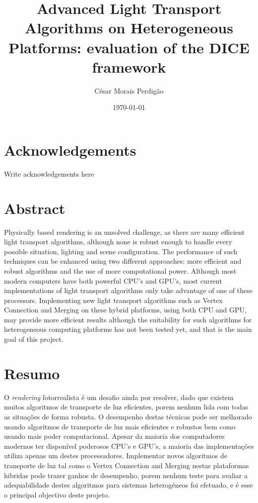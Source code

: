 \documentclass[
  oneside,
  11pt, a4paper,
  footinclude=true,
  headinclude=true,
  cleardoublepage=empty
]{scrbook}
\title{Advanced Light Transport Algorithms on Heterogeneous Platforms: evaluation of the DICE framework}
\author{César Morais Perdigão}
\date{\today}
\begin{document}
	

    
\sf
	\thispagestyle{empty}
	
\rm
	\cleardoublepage

\chapter*{Acknowledgements}
Write acknowledgements here

	\cleardoublepage
	
\chapter*{Abstract}
Physically based rendering is an unsolved challenge, as there are many efficient light transport algorithms, although none is robust enough to handle every possible situation, lighting and scene configuration. The performance of such techniques can be enhanced using two different approaches: more efficient and robust algorithms and the use of more computational power. Although most modern computers have both powerful CPU’s and GPU’s, most current implementations of light transport algorithms only take advantage of one of these processors. Implementing new light transport algorithms such as Vertex Connection and Merging on these hybrid platforms, using both CPU and GPU, may provide more efficient results although the suitability for such algorithms for heterogeneous computing platforms has not been tested yet, and that is the main goal of this project.

	\cleardoublepage

\chapter*{Resumo}
O \textit{rendering} fotorrealista é um desafio ainda por resolver, dado que existem muitos algoritmos de transporte de luz eficientes, porem nenhum lida com todas as situações de forma robusta. O desempenho destas técnicas pode ser melhorado usando algoritmos de transporte de luz mais eficientes e robustos bem como usando mais poder computacional. Apesar da maioria dos computadores modernos ter disponível poderosos CPU's e GPU's, a maioria das implementações utiliza apenas um destes processadores. Implementar novos algoritmos de transporte de luz tal como o Vertex Connection and Merging nestas plataformas hibridas pode trazer ganhos de desempenho, porem nenhum teste para avaliar a adequabilidade destes algoritmos para sistemas heterogéneos foi efetuado, e é esse o principal objectivo deste projeto.
\end{document}
